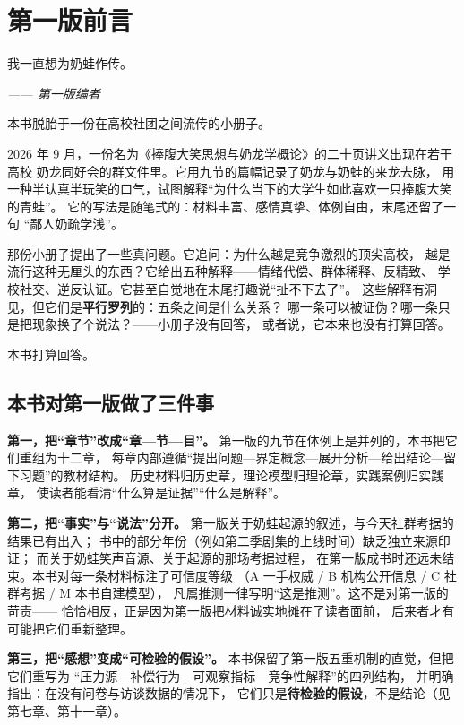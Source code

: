 \chapter*{第一版前言}

\epigraph{我一直想为奶蛙作传。}{\itshape —— 第一版编者}

本书脱胎于一份在高校社团之间流传的小册子。

2026 年 9 月，一份名为《捧腹大笑思想与奶龙学概论》的二十页讲义出现在若干高校
奶龙同好会的群文件里。它用九节的篇幅记录了奶龙与奶蛙的来龙去脉，
用一种半认真半玩笑的口气，试图解释“为什么当下的大学生如此喜欢一只捧腹大笑的青蛙”。
它的写法是随笔式的：材料丰富、感情真挚、体例自由，末尾还留了一句
“鄙人奶疏学浅”。

那份小册子提出了一些真问题。它追问：为什么越是竞争激烈的顶尖高校，
越是流行这种无厘头的东西？它给出五种解释——情绪代偿、群体稀释、反精致、
学校社交、逆反认证。它甚至自觉地在末尾打趣说“扯不下去了”。
这些解释有洞见，但它们是\textbf{平行罗列}的：五条之间是什么关系？
哪一条可以被证伪？哪一条只是把现象换了个说法？——小册子没有回答，
或者说，它本来也没有打算回答。

本书打算回答。

\section*{本书对第一版做了三件事}

\textbf{第一，把“章节”改成“章—节—目”。}
第一版的九节在体例上是并列的，本书把它们重组为十二章，
每章内部遵循“提出问题—界定概念—展开分析—给出结论—留下习题”的教材结构。
历史材料归历史章，理论模型归理论章，实践案例归实践章，
使读者能看清“什么算是证据”“什么是解释”。

\textbf{第二，把“事实”与“说法”分开。}
第一版关于奶蛙起源的叙述，与今天社群考据的结果已有出入；
书中的部分年份（例如第二季剧集的上线时间）缺乏独立来源印证；
而关于奶蛙笑声音源、关于起源的那场考据过程，
在第一版成书时还远未结束。本书对每一条材料标注了可信度等级
（A 一手权威 / B 机构公开信息 / C 社群考据 / M 本书自建模型），
凡属推测一律写明“这是推测”。这不是对第一版的苛责——
恰恰相反，正是因为第一版把材料诚实地摊在了读者面前，
后来者才有可能把它们重新整理。

\textbf{第三，把“感想”变成“可检验的假设”。}
本书保留了第一版五重机制的直觉，但把它们重写为
“压力源—补偿行为—可观察指标—竞争性解释”的四列结构，
并明确指出：在没有问卷与访谈数据的情况下，
它们只是\textbf{待检验的假设}，不是结论（见第七章、第十一章）。

